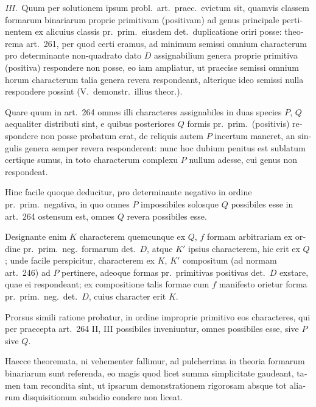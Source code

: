 \documentclass[12pt,a4paper]{article}
\theoremstyle{plain}
\theoremstyle{definition}
\theoremstyle{remark}
\begin{document}
\begin{otherlanguage}{latin}
\textit{III.}\ Quum per solutionem ipsum probl.\ art.\ praec.\ evictum sit, quamvis classem formarum binariarum proprie primitivam (positivam) ad genus principale pertinentem ex alicuius classis pr.\ prim.\ eiusdem det.\ duplicatione oriri posse: theorema art.\ 261, per quod certi eramus, ad minimum semissi omnium characterum pro determinante non-quadrato dato $D$ assignabilium genera proprie primitiva (positiva) respondere non posse, eo iam ampliatur, ut praecise semissi omnium horum characterum talia genera revera respondeant, alterique ideo semissi nulla respondere possint (V.\ demonstr.\ illius theor.).

Quare quum in art.\ 264 omnes illi characteres assignabiles in duas species $P$, $Q$ aequaliter distributi sint, e quibus posteriores $Q$ formis pr.\ prim.\ (positivis) respondere non posse probatum erat, de reliquis autem $P$ incertum maneret, an singulis genera semper revera responderent: nunc hoc dubium penitus est sublatum certique sumus, in toto characterum complexu $P$ nullum adesse, cui genus non respondeat.

Hinc facile quoque deducitur, pro determinante negativo in ordine pr.\ prim.\ negativa, in quo omnes $P$ impossibiles solosque $Q$ possibiles esse in art.\ 264 ostensum est, omnes $Q$ revera possibiles esse.

Designante enim $K$ characterem quemcunque ex $Q$, $f$ formam arbitrariam ex ordine pr.\ prim.\ neg.\ formarum det.\ $D$, atque $K'$ ipsius characterem, hic erit ex $Q$; unde facile perspicitur, characterem ex $K$, $K'$ compositum (ad normam art.\ 246) ad $P$ pertinere, adeoque formas pr.\ primitivas positivas det.\ $D$ exstare, quae ei respondeant; ex compositione talis formae cum $f$ manifesto orietur forma pr.\ prim.\ neg.\ det.\ $D$, cuius character erit $K$.

Prorsus simili ratione probatur, in ordine improprie primitivo eos characteres, qui per praecepta art.\ 264 II, III possibiles inveniuntur, omnes possibiles esse, sive $P$ sive $Q$.

Haecce theoremata, ni vehementer fallimur, ad pulcherrima in theoria formarum binariarum sunt referenda, eo magis quod licet summa simplicitate gaudeant, tamen tam recondita sint, ut ipsarum demonstrationem rigorosam absque tot aliarum disquisitionum subsidio condere non liceat.

\end{otherlanguage}
\end{document}
